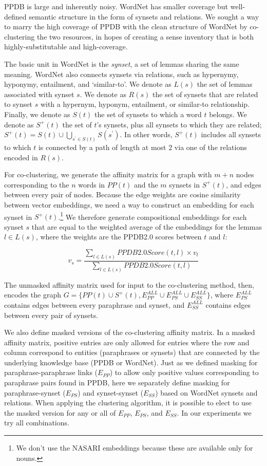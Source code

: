 \documentclass[11pt]{article}
\begin{document}
PPDB is large and inherently noisy. WordNet  
has smaller coverage but well-defined semantic structure in the form of synsets and relations. We sought a way to marry the high coverage of PPDB with the clean structure of WordNet by co-clustering the two resources, in hopes of creating a sense inventory that is both highly-substitutable and high-coverage. 

The basic unit in WordNet is the \textit{synset}, a set of lemmas sharing the same meaning. WordNet also connects synsets via relations, such as hypernymy, hyponymy, entailment, and `similar-to'. We denote as $L(s)$ the set of lemmas associated with synset $s$. We denote as $R(s)$ the set of synsets that are related to synset $s$ with a hypernym, hyponym, entailment, or similar-to relationship. Finally, we denote as $S(t)$ the set of synsets to which a word $t$ belongs. We denote as $S^+(t)$ the set of $t$'s synsets, plus all synsets to which they are related; $S^+(t) = S(t) \cup \bigcup_{s^\prime \in S(t)} S(s^\prime)$. In other words, $S^+(t)$ includes all synsets to which $t$ is connected by a path of length at most 2 via one of the relations encoded in $R(s)$.

For co-clustering, we generate the affinity matrix for a graph with $m+n$ nodes corresponding to the $n$ words in $PP(t)$ and the $m$ synsets in $S^+(t)$, and edges between every pair of nodes. Because the edge weights are cosine similarity between vector embeddings, we need a way to construct an embedding for each synset in $S^+(t)$.\footnote{We don't use the NASARI embeddings \cite{camachocollados-pilehvar-navigli:2015:NAACL-HLT} because these are available only for nouns.} We therefore generate compositional embeddings for each synset $s$ that are equal to the weighted average of the embeddings for the lemmas $l \in L(s)$, where the weights are the PPDB2.0 scores between $t$ and $l$:

\[v_s = \frac{\sum_{l \in L(s)} PPDB2.0Score(t, l) \times v_l}{\sum_{l \in L(s)} PPDB2.0Score(t, l)}\]

\noindent The unmasked affinity matrix used for input to the co-clustering method, then, encodes the graph $G = \{PP(t) \cup S^+(t), E_{PP}^{ALL} \cup E_{PS}^{ALL} \cup E_{SS}^{ALL} \}$, where $E_{PS}^{ALL}$ contains edges between every paraphrase and synset, and $E_{SS}^{ALL}$ contains edges between every pair of synsets.

We also define masked versions of the co-clustering affinity matrix. In a masked affinity matrix, positive entries are only allowed for entries where the row and column correspond to entities (paraphrases or synsets) that are connected by the underlying knowledge base (PPDB or WordNet). Just as we defined masking for paraphrase-paraphrase links ($E_{PP}$) to allow only positive values corresponding to paraphrase pairs found in PPDB, here we separately define masking for paraphrase-synset ($E_{PS}$) and synset-synset ($E_{SS}$) based on WordNet synsets and relations. When applying the clustering algorithm, it is possible to elect to use the masked version for any or all of $E_{PP}$, $E_{PS}$, and $E_{SS}$. In our experiments we try all combinations.
\end{document}
